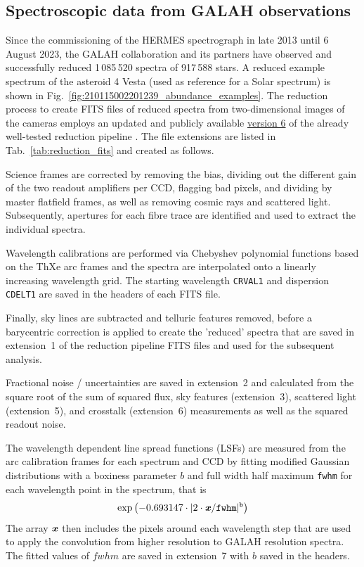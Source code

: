 \documentclass[
  journal=pasa,
  manuscript=research-paper, %
  year=2024,
  volume=37
]{cup-journal}
\newcommand{\allstarnumber}{917\,588\xspace}
\newcommand{\allspecnumber}{1\,085\,520\xspace}
\begin{document}
\subsection{Spectroscopic data from GALAH observations}
\label{sec:spectroscopic_data_from_galah_observations}

Since the commissioning of the HERMES spectrograph in late 2013 until 6 August 2023, the GALAH collaboration and its partners have observed and successfully reduced \allspecnumber spectra of \allstarnumber stars. A reduced example spectrum of the asteroid 4 Vesta (used as reference for a Solar spectrum) is shown in Fig.~\ref{fig:210115002201239_abundance_examples}. The reduction process to create FITS files of reduced spectra from two-dimensional images of the cameras employs an updated and publicly available \href{https://github.com/sheliak/galah_reduction/blob/master/extract6.0.py}{version 6} of the already well-tested reduction pipeline \citep{Kos2017}. The file extensions are listed in Tab.~\ref{tab:reduction_fits} and created as follows.

Science frames are corrected by removing the bias, dividing out the different gain of the two readout amplifiers per CCD, flagging bad pixels, and dividing by master flatfield frames, as well as removing cosmic rays and scattered light. Subsequently, apertures for each fibre trace are identified and used to extract the individual spectra. 

Wavelength calibrations are performed via Chebyshev polynomial functions based on the ThXe arc frames and the spectra are interpolated onto a linearly increasing wavelength grid. The starting wavelength \texttt{CRVAL1} and dispersion \texttt{CDELT1} are saved in the headers of each FITS file.

Finally, sky lines are subtracted and telluric features removed, before a barycentric correction is applied to create the 'reduced' spectra that are saved in extension~1 of the reduction pipeline FITS files and used for the subsequent analysis. 

Fractional noise / uncertainties are saved in extension~2 and calculated from the square root of the sum of squared flux, sky features (extension~3), scattered light (extension~5), and crosstalk (extension~6) measurements as well as the squared readout noise.

The wavelength dependent line spread functions (LSFs) are measured from the arc calibration frames for each spectrum and CCD by fitting modified Gaussian distributions with a boxiness parameter $b$ and full width half maximum \texttt{fwhm} for each wavelength point in the spectrum, that is
\begin{align}
    \exp \left(-0.693147 \cdot \vert 2 \cdot \textbf{\textit{x}}/\texttt{fwhm} \vert^\texttt{b}\right) \label{eq:lsf}
\end{align}
The array $\textbf{\textit{x}}$ then includes the pixels around each wavelength step that are used to apply the convolution from higher resolution to GALAH resolution spectra. The fitted values of $fwhm$ are saved in extension~7 with $b$ saved in the headers.
\end{document}
